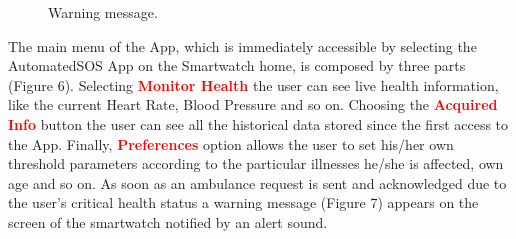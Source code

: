 \begin{enumerate}
\begin{figure}
\begin{center}
\begin{minipage}[c]{.40\textwidth}
          	\caption{Warning message.}
        \end{minipage}
      \end{center}
\end{figure}
The main menu of the App, which is immediately accessible by selecting the AutomatedSOS App on the Smartwatch home, is composed by three parts (Figure 6). Selecting {\textcolor{Red}{\textbf{Monitor Health}}} the user can see live health information, like the current Heart Rate, Blood Pressure and so on. Choosing the {\textcolor{Red}{\textbf{Acquired Info}}} button the user can see all the historical data stored since the first access to the App. Finally, {\textcolor{Red}{\textbf{Preferences}}} option allows the user to set his/her own threshold parameters according to the particular illnesses he/she is affected, own age and so on. As soon as an ambulance request is sent and acknowledged due to the user's critical health status a warning message (Figure 7) appears on the screen of the smartwatch notified by an alert sound.
\clearpage


\end{enumerate}
